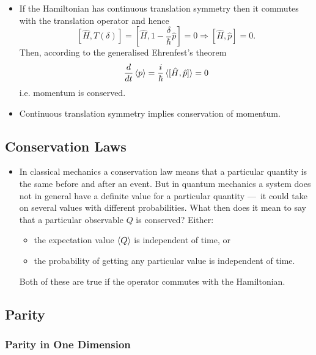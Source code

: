 \documentclass{article}
\begin{document}
\begin{itemize}
  \item If the Hamiltonian has continuous translation symmetry then it commutes with the translation operator and hence \[[\hat{H}, \hat{T}(\delta)] = \left[ \hat{H}, 1 - \frac{\delta}{\hbar} \hat{p} \right] = 0 \Rightarrow [\hat{H}, \hat{p}] = 0.\] Then, according to the generalised Ehrenfest's theorem \[\frac{d}{d t} \braket{p} = \frac{i}{\hbar} \braket{[\hat{H}, \hat{p}]} = 0\] i.e. momentum is conserved.

  \item Continuous translation symmetry implies conservation of momentum.
\end{itemize}

\subsection{Conservation Laws}

\begin{itemize}
  \item In classical mechanics a conservation law means that a particular quantity is the same before and after an event. But in quantum mechanics a system does not in general have a definite value for a particular quantity — it could take on several values with different probabilities. What then does it mean to say that a particular observable $Q$ is conserved? Either:

        \begin{itemize}
          \item the expectation value $\braket{Q}$ is independent of time, or

          \item the probability of getting any particular value is independent of time.
        \end{itemize}

        Both of these are true if the operator commutes with the Hamiltonian.
\end{itemize}

\subsection{Parity}

\subsubsection{Parity in One Dimension}
\end{document}
